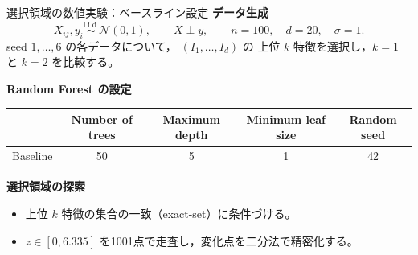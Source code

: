 \documentclass[aspectratio=169,11pt]{beamer}
\begin{document}
\begin{frame}{選択領域の数値実験：ベースライン設定}
  \small
  \textbf{データ生成}
  \[
    X_{ij},y_i\overset{\mathrm{i.i.d.}}{\sim}\mathcal N(0,1),\qquad
    X\perp y,\qquad n=100,\quad d=20,\quad\sigma=1.
  \]
  seed $1,\ldots,6$ の各データについて， $(I_1,\ldots,I_d)$ の
  上位 $k$ 特徴を選択し，$k=1$ と $k=2$ を比較する。

  \vspace{0.18cm}
  \textbf{Random Forest の設定}
  \begin{center}
    \renewcommand{\arraystretch}{1.12}
    \begin{tabular}{lcccc}
      \toprule
      & Number of trees & Maximum depth & Minimum leaf size & Random seed \\
      \midrule
      Baseline & 50 & 5 & 1 & 42 \\
      \bottomrule
    \end{tabular}
  \end{center}

  \vspace{0.08cm}
  \textbf{選択領域の探索}
  \begin{itemize}
    \setlength{\itemsep}{0.08cm}
    \item 上位 $k$ 特徴の集合の一致（exact-set）に条件づける。
    \item $z\in[0,6.335]$ を1001点で走査し，変化点を二分法で精密化する。
  \end{itemize}
\end{frame}
\end{document}
